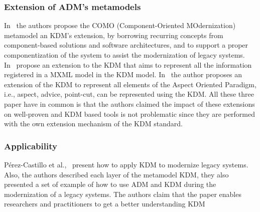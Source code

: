 \subsubsection{Extension of ADM's metamodels} %
\label{ssub:extension_of_adm_s_metamodels}


In~\cite{5773392} the authors propose the COMO (Component-Oriented MOdernization) metamodel an KDM's extension, by borrowing recurring concepts from component-based solutions and software architectures, and to support a proper componentization of the system to assist the modernization of legacy systems. In~\cite{Perez-Castillo:2012:IEL:2231936.2231949} propose an extension to the KDM that aims to represent all the information registered in a MXML model in the KDM model. In~\cite{library7329} the author proposes an extension of the KDM to represent all elements of the Aspect Oriented Paradigm, i.e., aspect, advice, point-cut, can be represented using the KDM. All these three paper have in common is that the authors claimed the impact of these extensions on well-proven and KDM based tools is not problematic since they are performed with the own extension mechanism of the KDM standard.


\subsubsection{Applicability} %
\label{ssub:applicability}


P\'{e}rez-Castillo et al.,~\cite{PrezCastillo2011519, Perez-Castillo:2012:IEL:2231936.2231949, 6498507} present how to apply KDM to modernize legacy systems. Also, the authors described each layer of the metamodel KDM, they also presented a set of example of how to use ADM and KDM during the modernization of a legacy systems. The authors claim that the paper enables researchers and practitioners to get a better understanding KDM









